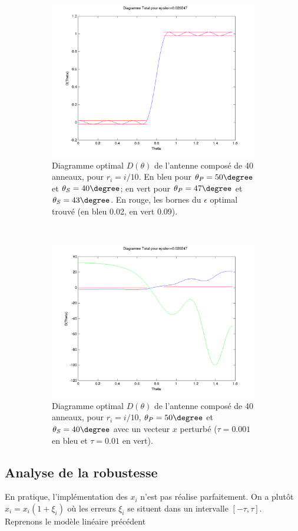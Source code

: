 \begin{figure}[h!]
  \centering
  \begin{subfigure}[b]{0.45\textwidth}
  \includegraphics[width=\textwidth]{D-ModLin.png}
  \caption{Diagramme optimal $D(\theta)$ de l'antenne composé de 40 anneaux, pour $r_i=i/10$. En bleu pour $\theta_P=50 \degree$ et $\theta_S=40 \degree$; en vert pour $\theta_P=47 \degree$ et $\theta_S=43 \degree$. En rouge, les bornes du $\epsilon$ optimal trouvé (en bleu 0.02, en vert 0.09).}
  \label{fig:D-ModLin}
  \end{subfigure}%
  ~ 
  \begin{subfigure}[b]{0.45\textwidth}
  \includegraphics[width=\textwidth]{D-ModLin-Robust.png}
  \caption{Diagramme optimal $D(\theta)$ de l'antenne composé de 40 anneaux, pour $r_i=i/10$, $\theta_P=50 \degree$ et $\theta_S=40 \degree$ avec un vecteur $x$ perturbé ($\tau=0.001$ en bleu et $\tau = 0.01$ en vert).}
  \label{fig:D-ModLin-Robust}
  \end{subfigure}
  \caption{}
  \end{figure}


\subsection{Analyse de la robustesse}
En pratique, l'implémentation des $x_i$ n'est pas réalise parfaitement. On a plutôt $\hat{x}_i = x_i(1+\xi_i)$ où les erreurs $\xi_i$ se situent dans un intervalle $[-\tau,\tau]$.\\
Reprenons le modèle linéaire précédent 









